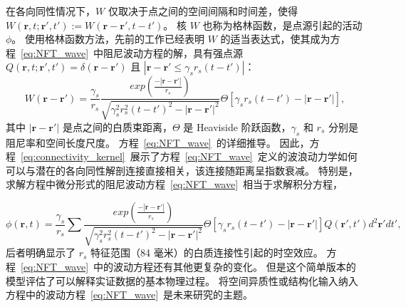 \documentclass[lang=cn,a4paper,newtx,citestyle=gb7714-2015, bibstyle=gb7714-2015]{elegantpaper}
\begin{document}
在各向同性情况下，$ W $ 仅取决于点之间的空间间隔和时间差，使得 $ W(\boldsymbol{r}, t; \boldsymbol{r}', t') := W(\boldsymbol{r} - \boldsymbol{r}', t-t') $。
核 $ W $ 也称为格林函数，是点源引起的活动 $ \phi $。
使用格林函数方法\cite{pang2021stochastic}，先前的工作已经表明 $ W $ 的适当表达式，使其成为方程~\ref{eq:NFT_wave}~中阻尼波动方程的解，具有强点源 
$ Q(\boldsymbol{r}, t; \boldsymbol{r}', t') = \delta(\boldsymbol{r} - \boldsymbol{r}') $ 且 
$ |\boldsymbol{r} - \boldsymbol{r}' \leq \gamma_s r_s (t-t')| $：\cite{wright1995simulation,jirsa1996field,robinson1997propagation,nozari2020brain}
%
\begin{equation}\label{eq:connectivity_kernel}
	W(\boldsymbol{r} - \boldsymbol{r}') = 
		\frac{\gamma_s}{r_s}
		\frac{exp(\frac{-|\boldsymbol{r}-\boldsymbol{r}'|}{r_s})}{\sqrt{\gamma_s^2 r_s^2 (t-t')^2 - |\boldsymbol{r} - \boldsymbol{r}'|^2}}
		\Theta
		[\gamma_s r_s (t-t') - |\boldsymbol{r} - \boldsymbol{r}'|],
\end{equation}
%
其中 $ |\boldsymbol{r} - \boldsymbol{r}'| $ 是点之间的白质束距离，$ \Theta $ 是 Heaviside 阶跃函数，$ \gamma_s $ 和 $ r_s $ 分别是阻尼率和空间长度尺度。
方程~\ref{eq:NFT_wave}~的详细推导。 
因此，方程~\ref{eq:connectivity_kernel}~展示了方程~\ref{eq:NFT_wave}~定义的波浪动力学如何可以与潜在的各向同性解剖连接直接相关，该连接随距离呈指数衰减。
特别是，求解方程中微分形式的阻尼波动方程~\ref{eq:NFT_wave}~相当于求解积分方程，

\begin{equation}\label{eq:integral_equation}
	\phi(\boldsymbol{r}, t) = 
		\frac{\gamma_s}{r_s} \sum
			\frac{exp(\frac{-|\boldsymbol{r}-\boldsymbol{r}'|}{r_s})}{\sqrt{\gamma_s^2 r_s^2 (t-t')^2 - |\boldsymbol{r} - \boldsymbol{r}'|^2}}
			\Theta
			[\gamma_s r_s (t-t') - |\boldsymbol{r} - \boldsymbol{r}'|]
			Q(\boldsymbol{r}', t')
			d^2 \boldsymbol{r}'
			dt',
\end{equation}
%
后者明确显示了 $ r_s $ 特征范围（84 毫米\cite{robinson1997propagation}）的白质连接性引起的时空效应。
方程~\ref{eq:NFT_wave}~中的波动方程还有其他更复杂的变化。
但是这个简单版本的模型评估了可以解释实证数据的基本物理过程。
将空间异质性或结构化输入纳入方程中的波动方程~\ref{eq:NFT_wave}~是未来研究的主题。
\end{document}
